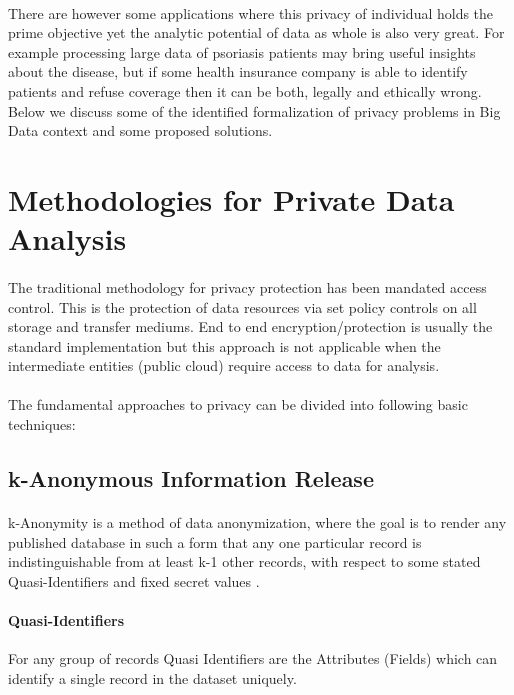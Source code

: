 \documentclass[12pt]{report}
\begin{document}
\paragraph{}
There are however some applications where this privacy of individual holds the prime objective yet the analytic potential of data as whole is also very great. For example processing large data of psoriasis patients may bring useful insights about the disease, but if some health insurance company is able to identify patients and refuse coverage then it can be both, legally and ethically wrong. 
Below we discuss some of the identified formalization of privacy problems in Big Data context and some proposed solutions.



\section{Methodologies for Private Data Analysis}
\paragraph{}
The traditional methodology for privacy protection has been mandated access control. This is the protection of data resources via set policy controls on all storage and transfer mediums. End to end encryption/protection is usually the standard implementation but this approach is not applicable when the intermediate entities (public cloud) require access to data for analysis.
\paragraph{}
The fundamental approaches to privacy can be divided into following basic techniques:


\subsection{k-Anonymous Information Release}
\paragraph{}
k-Anonymity \cite{sweeney2002k} is a method of data anonymization, where the goal is to render any published database in such a form that any one particular record is indistinguishable from at least k-1 other records, with respect to some stated Quasi-Identifiers and fixed secret values \cite{dalenius1986finding}.

\paragraph{Quasi-Identifiers}
For any group of records Quasi Identifiers are the Attributes (Fields) which can identify a single record in the dataset uniquely.
\end{document}
